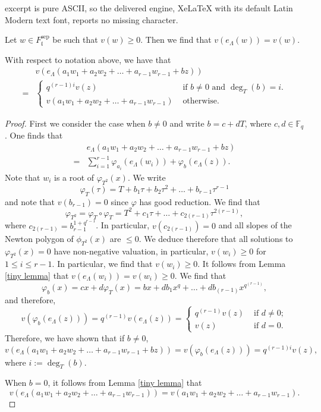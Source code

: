 \documentclass[10pt,a4paper]{amsart}
\newcommand{\F}{\mathbb{F}}
\newcommand{\fl}{\mathfrak{l}}
\newcommand{\op}[1]{\operatorname{#1}}
\begin{document}
excerpt is pure ASCII, so the delivered engine, XeLaTeX with its default Latin Modern text font, reports no missing character.
\begin{lemma}\label{tiny lemma}
    Let $w\in F_{\fl}^{\op{sep}}$ be such that $v(w)\geq 0$. Then we find that $v(e_\Lambda(w))=v(w)$. 
\end{lemma}

\begin{lemma}\label{v equals technical lemma}
    With respect to notation above, we have that 
    \[\begin{split} & v\left(e_\Lambda(a_1 w_1+a_2 w_2+\dots+a_{r-1} w_{r-1} +b z)\right) \\ = &\begin{cases}
        q^{(r-1)i}v(z) & \text{ if }b\neq 0\text{ and }\op{deg}_T(b)=i.\\
        v(a_1 w_1+a_2 w_2+\dots+a_{r-1} w_{r-1})& \text{ otherwise. }
    \end{cases}
    \end{split}\]
\end{lemma}

\begin{proof}
    \par First we consider the case when $b\neq 0$ and write $b=c+dT$, where $c, d\in \F_q$. One finds that 
\[\begin{split} & e_\Lambda(a_1 w_1+a_2 w_2+\dots+a_{r-1} w_{r-1} +b z) \\ 
=& \sum_{i=1}^{r-1} \varphi_{a_i} \left(e_{\Lambda}(w_i)\right)+\varphi_b \left(e_{\Lambda}(z)\right).\end{split}\]
Note that $w_i$ is a root of $\varphi_{T^2}(x)$. We write \[\varphi_T(\tau)=T+b_1 \tau+ b_2 \tau^2+\dots+ b_{r-1}\tau^{r-1}\] and note that $v(b_{r-1})=0$ since $\varphi$ has good reduction. We find that 
\[\varphi_{T^2}=\varphi_T\circ \varphi_T=T^2+c_1\tau+\dots +c_{2(r-1)}\tau^{2(r-1)},\] where $c_{2(r-1)}=b_{r-1}^{1+q^{r-1}}$. In particular, $v(c_{2(r-1)})=0$ and all slopes of the Newton polygon of $\phi_{T^2}(x)$ are $\leq 0$. We deduce therefore that all solutions to $\varphi_{T^2}(x)=0$ have non-negative valuation, in particular, $v(w_i)\geq 0$ for $1\leq i\leq r-1$. In particular, we find that $v(w_i)\geq 0$. It follows from Lemma \ref{tiny lemma} that $v(e_{\Lambda}(w_i))=v(w_i)\geq 0$. We find that
\[\varphi_b(x)=cx+d\varphi_T(x)=bx+db_1x^q+\dots +d b_{(r-1)} x^{q^{(r-1)}},\]
and therefore, 
\[v\left(\varphi_b(e_\Lambda(z))\right)=q^{(r-1)}v(e_\Lambda(z))=\begin{cases}
    q^{(r-1)}v(z) &\text{ if }d\neq 0;\\
    v(z) &\text{ if }d=0.
\end{cases}\]
Therefore, we have shown that if $b\neq 0$, 
\[v\left(e_\Lambda(a_1 w_1+a_2 w_2+\dots+a_{r-1} w_{r-1} +b z)\right)=v\left(\varphi_b(e_\Lambda(z))\right)=q^{(r-1)i}v(z),\]
where $i:=\op{deg}_T(b)$.
\par When $b=0$, it follows from Lemma \ref{tiny lemma} that 
\[v\left(e_\Lambda(a_1 w_1+a_2 w_2+\dots+a_{r-1} w_{r-1})\right)=v(a_1 w_1+a_2 w_2+\dots+a_{r-1} w_{r-1}).\]
\end{proof}
\end{document}
